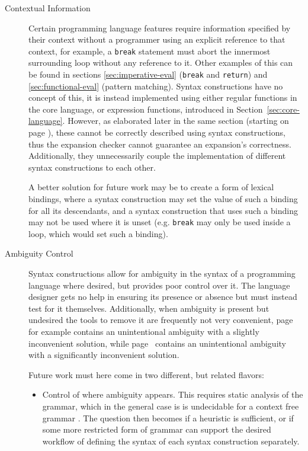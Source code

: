 \documentclass{kththesis}
\begin{document}
\begin{description}
  \item[Contextual Information] Certain programming language features require information specified by their context without a programmer using an explicit reference to that context, for example, a \texttt{break} statement must abort the innermost surrounding loop without any reference to it. Other examples of this can be found in sections \ref{sec:imperative-eval} (\texttt{break} and \texttt{return}) and \ref{sec:functional-eval} (pattern matching). Syntax constructions have no concept of this, it is instead implemented using either regular functions in the core language, or expression functions, introduced in Section~\ref{sec:core-language}. However, as elaborated later in the same section (starting on page \pageref{sec:efun-drawbacks}), these cannot be correctly described using syntax constructions, thus the expansion checker cannot guarantee an expansion's correctness. Additionally, they unnecessarily couple the implementation of different syntax constructions to each other.

  A better solution for future work may be to create a form of lexical bindings, where a syntax construction may set the value of such a binding for all its descendants, and a syntax construction that uses such a binding may not be used where it is unset (e.g. \texttt{break} may only be used inside a loop, which would set such a binding).

  \item[Ambiguity Control] Syntax constructions allow for ambiguity in the syntax of a programming language where desired, but provides poor control over it. The language designer gets no help in ensuring its presence or absence but must instead test for it themselves. Additionally, when ambiguity is present but undesired the tools to remove it are frequently not very convenient, page~\pageref{sec:lua-func-call-precedence} for example contains an unintentional ambiguity with a slightly inconvenient solution, while page~\pageref{sec:ambiguous-lists} contains an unintentional ambiguity with a significantly inconvenient solution.

  Future work must here come in two different, but related flavors:
  \begin{itemize}
    \item Control of where ambiguity appears. This requires static analysis of the grammar, which in the general case is is undecidable for a context free grammar \cite{Cantor1962On-The-Ambiguit}. The question then becomes if a heuristic is sufficient, or if some more restricted form of grammar can support the desired workflow of defining the syntax of each syntax construction separately.


\end{itemize}
\end{description}
\end{document}
